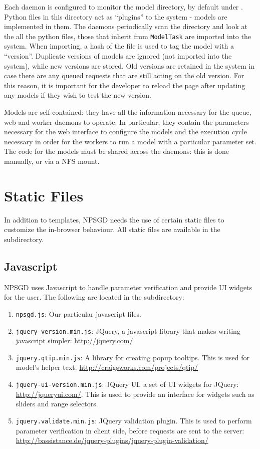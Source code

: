 \documentclass{article}
\newcommand{\mclass}[1]{\texttt{#1}}
\begin{document}
Each daemon is configured to monitor the model directory, by default under
. Python files in this directory act as ``plugins'' to the system
- models are implemented in them. The daemons periodically scan the directory
and look at the all the python files, those that inherit from \mclass{ModelTask}
are imported into the system. When importing, a hash of the file is used to tag
the model with a ``version''. Duplicate versions of models are ignored (not
imported into the system), while new versions are stored. Old versions are
retained in the system in case there are any queued requests that are still
acting on the old version. For this reason, it is important for the developer to 
reload the page after updating any models if they wish to test the new version.

Models are self-contained: they have all the information necessary for the
queue, web and worker daemons to operate. In particular, they contain the
parameters necessary for the web interface to configure the models and the
execution cycle necessary in order for the workers to run a model with a
particular parameter set. The code for the models must be shared
across the daemons: this is done manually, or via a NFS mount.


\section{Static Files}
In addition to templates, NPSGD needs the use of certain static files to
customize the in-browser behaviour. All static files are available in the
 subdirectory.

\subsection{Javascript}
NPSGD uses Javascript to handle parameter verification and provide UI
widgets for the user. The following are located in the 
subdirectory:
\begin{enumerate}
    \item \texttt{npsgd.js}: Our particular javascript files.
    \item \texttt{jquery-version.min.js}: JQuery, a javascript library that
    makes writing javascript simpler: \url{http://jquery.com/}
    \item \texttt{jquery.qtip.min.js}: A library for creating popup tooltips.
    This is used for model's helper text.
    \url{http://craigsworks.com/projects/qtip/}
    \item \texttt{jquery-ui-version.min.js}: JQuery UI, a set of UI widgets for
    JQuery: \url{http://jqueryui.com/}. This is used to provide an interface for 
    widgets such as sliders and range selectors.
    \item \texttt{jquery.validate.min.js}: JQuery validation plugin. This is
    used to perform parameter verification in client side, before requests are sent
    to the server:
    \url{http://bassistance.de/jquery-plugins/jquery-plugin-validation/}
\end{enumerate}
\end{document}
